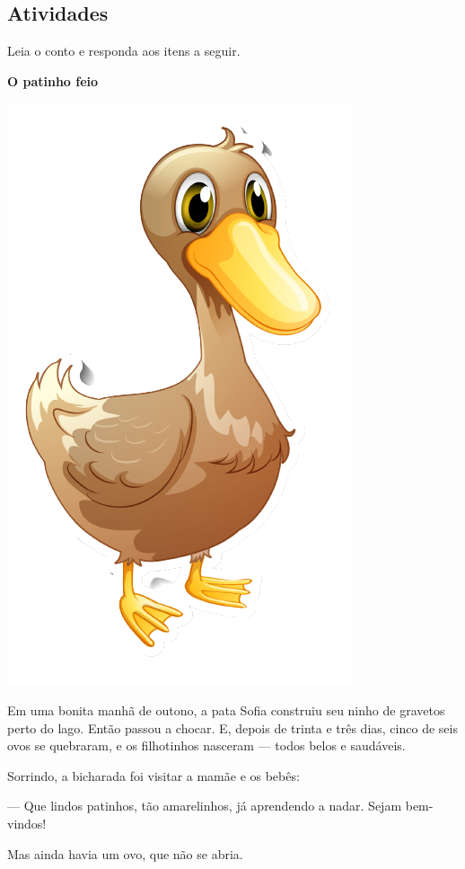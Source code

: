 \begin{conteudo}
\begin{conteudo}
\begin{conteudo}
\begin{conteudo}
\begin{conteudo}
\section*{Atividades}

Leia o conto e responda aos itens a seguir.



\begin{myquote}

\textbf{O patinho feio}

\begin{center}
\includegraphics[width=.3\textwidth]{media/image36a.png}
\end{center}

Em uma bonita manhã de outono, a pata Sofia construiu seu ninho de
gravetos perto do lago. Então passou a chocar. E, depois de trinta e
três dias, cinco de seis ovos se quebraram, e os filhotinhos nasceram
--- todos belos e saudáveis.

Sorrindo, a bicharada foi visitar a mamãe e os bebês:

--- Que lindos patinhos, tão amarelinhos, já aprendendo a nadar. Sejam
bem-vindos!

Mas ainda havia um ovo, que não se abria.


\end{myquote}
\end{conteudo}
\end{conteudo}
\end{conteudo}
\end{conteudo}
\end{conteudo}
